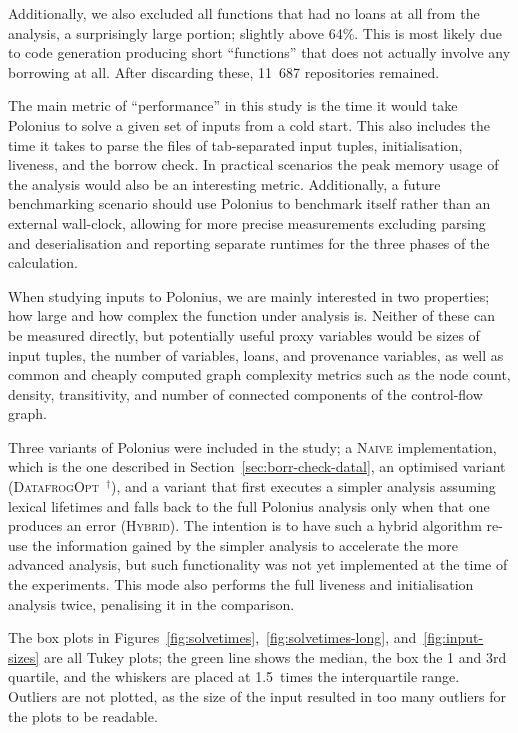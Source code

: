 \documentclass[11pt,a4paper,twoside,openany,draft]{report}
\newcommand{\notmine}[0] {$^\dagger$}
\begin{document}
Additionally, we also excluded all functions that had no loans at all from the
analysis, a surprisingly large portion; slightly above 64\%. This is most likely
due to code generation producing short ``functions'' that does not actually
involve any borrowing at all. After discarding these, 11~687 repositories
remained.

The main metric of ``performance'' in this study is the time it would take
Polonius to solve a given set of inputs from a cold start. This also includes
the time it takes to parse the files of tab-separated input tuples,
initialisation, liveness, and the borrow check. In practical scenarios the peak
memory usage of the analysis would also be an interesting metric. Additionally,
a future benchmarking scenario should use Polonius to benchmark itself rather
than an external wall-clock, allowing for more precise measurements excluding
parsing and deserialisation and reporting separate runtimes for the three
phases of the calculation.

When studying inputs to Polonius, we are mainly interested in two properties;
how large and how complex the function under analysis is. Neither of these can
be measured directly, but potentially useful proxy variables would be sizes of
input tuples, the number of variables, loans, and provenance variables, as well
as common and cheaply computed graph complexity metrics such as the node count,
density, transitivity, and number of connected components of the control-flow
graph.

Three variants of Polonius were included in the study; a \textsc{Naive}
implementation, which is the one described in
Section~\ref{sec:borr-check-datal}, an optimised variant
(\textsc{DatafrogOpt}~\notmine{}), and a variant that first executes a simpler
analysis assuming lexical lifetimes and falls back to the full Polonius analysis
only when that one produces an error (\textsc{Hybrid}). The intention is to have
such a hybrid algorithm re-use the information gained by the simpler analysis to
accelerate the more advanced analysis, but such functionality was not yet
implemented at the time of the experiments. This mode also performs the full
liveness and initialisation analysis twice, penalising it in the
comparison.

The box plots in Figures~\ref{fig:solvetimes},~\ref{fig:solvetimes-long},
and~\ref{fig:input-sizes} are all Tukey plots; the green line shows the median,
the box the 1 and 3rd quartile, and the whiskers are placed at 1.5~times the
interquartile range. Outliers are not plotted, as the size of the input resulted
in too many outliers for the plots to be readable.
\end{document}
